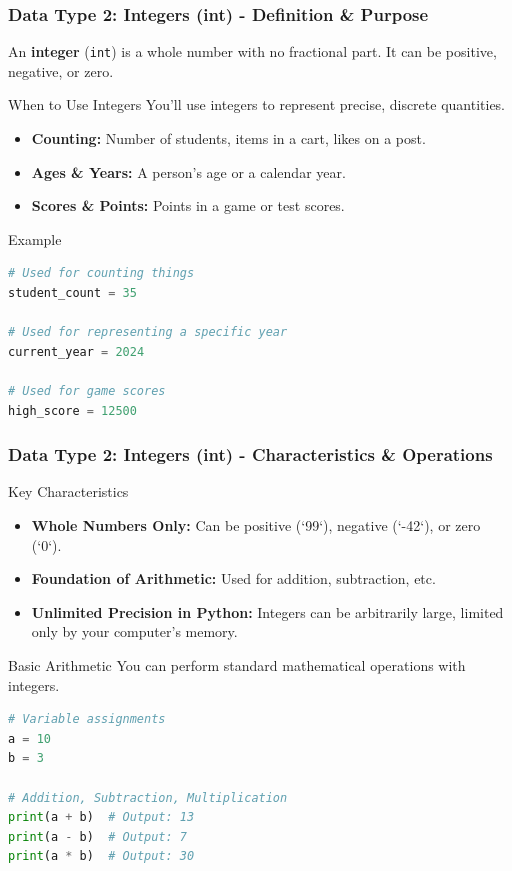 \documentclass{beamer}
\begin{document}
\begin{frame}[fragile]
    \frametitle{Data Type 2: Integers (int) - Definition \& Purpose}
    
    An \textbf{integer} (\texttt{int}) is a whole number with no fractional part. It can be positive, negative, or zero.
    
    \begin{block}{When to Use Integers}
        You'll use integers to represent precise, discrete quantities.
        \begin{itemize}
            \item \textbf{Counting:} Number of students, items in a cart, likes on a post.
            \item \textbf{Ages \& Years:} A person's age or a calendar year.
            \item \textbf{Scores \& Points:} Points in a game or test scores.
        \end{itemize}
    \end{block}
    
    \begin{block}{Example}
        \begin{lstlisting}[language=Python]
# Used for counting things
student_count = 35

# Used for representing a specific year
current_year = 2024

# Used for game scores
high_score = 12500
        \end{lstlisting}
    \end{block}
    
\end{frame}

\begin{frame}[fragile]
    \frametitle{Data Type 2: Integers (int) - Characteristics \& Operations}

    \begin{block}{Key Characteristics}
        \begin{itemize}
            \item \textbf{Whole Numbers Only:} Can be positive (`99`), negative (`-42`), or zero (`0`).
            \item \textbf{Foundation of Arithmetic:} Used for addition, subtraction, etc.
            \item \textbf{Unlimited Precision in Python:} Integers can be arbitrarily large, limited only by your computer's memory.
        \end{itemize}
    \end{block}
    
    \begin{block}{Basic Arithmetic}
        You can perform standard mathematical operations with integers.
        \begin{lstlisting}[language=Python]
# Variable assignments
a = 10
b = 3

# Addition, Subtraction, Multiplication
print(a + b)  # Output: 13
print(a - b)  # Output: 7
print(a * b)  # Output: 30
        \end{lstlisting}
    \end{block}
    
\end{frame}
\end{document}
